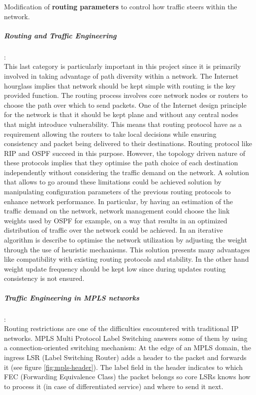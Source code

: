 Modification of {\bf routing parameters} to control how traffic steers within the network. 

\subparagraph{Routing and Traffic Engineering }:
\\This last category is particularly important in this project since it is primarily involved in taking advantage of path diversity within a network. The Internet hourglass implies that network should be kept simple with routing is the key provided function. The routing process involves core network nodes or routers to choose the path over which to send packets. One of the Internet design principle  for the network is that it should be kept plane and without any central nodes that might introduce  vulnerability. This means that routing protocol have as a requirement allowing the routers to take local decisions while ensuring consistency and packet being delivered to their destinations. Routing protocol like RIP and OSPF succeed in this purpose. However, the topology driven nature of these protocols implies that they optimise the path choice of each destination independently without considering the traffic demand on the network.  A solution that allows to go around these limitations could be achieved solution by manipulating configuration parameters of the previous routing protocols to enhance network performance.  In particular, by having an estimation of the traffic demand on the network, network management could choose the link weights  used by OSPF for example, on a way that results in an optimized distribution of traffic over the network could be achieved. In \cite{fortz00} an iterative algorithm is describe to optimise the network utilization by adjusting the weight through the use of heuristic mechanisms. This solution presents many advantages like compatibility with existing routing protocols and stability. In the other hand weight update frequency should be kept low since during updates routing consistency is not ensured.

\subparagraph{Traffic Engineering in MPLS networks}:
\\Routing restrictions are one of the difficulties encountered with traditional IP networks. MPLS  Multi Protocol Label Switching answers some of them by using a connection-oriented switching mechanism:  At the edge of an MPLS domain, the ingress LSR (Label Switching Router) adds a header to the packet and forwards it (see figure \ref{fig:mpls-header}). The label field in the header indicates to which FEC (Forwarding Equivalence Class) the packet belongs so core LSRs knows how to process it (in case of differentiated service) and where to send it next. 

